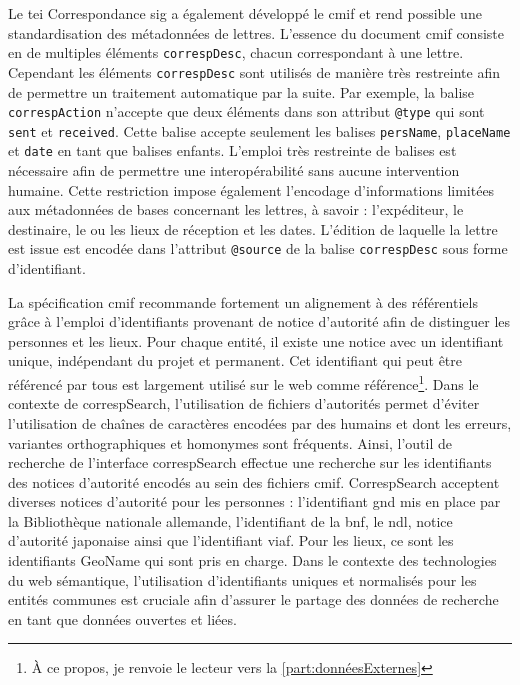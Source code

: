 \documentclass[a4paper, 12pt, twoside]{book}
\begin{document}
Le \gls{tei} Correspondance \gls{sig} a également développé le \gls{cmif} et rend possible une standardisation des métadonnées de lettres. L'essence du document \gls{cmif} consiste en de multiples éléments \texttt{correspDesc}, chacun correspondant à une lettre. Cependant les éléments \texttt{correspDesc} sont utilisés de manière très restreinte afin de permettre un traitement automatique par la suite. Par exemple, la balise \texttt{correspAction} n'accepte que deux éléments dans son attribut \texttt{@type} qui sont \texttt{sent} et \texttt{received}. Cette balise accepte seulement les balises \texttt{persName}, \texttt{placeName} et \texttt{date} en tant que balises enfants. L'emploi très restreinte de balises est nécessaire afin de permettre une interopérabilité sans aucune intervention humaine. Cette restriction impose également l'encodage d'informations limitées aux métadonnées de bases concernant les lettres, à savoir : l'expéditeur, le destinaire, le ou les lieux de réception et les dates. L'édition de laquelle la lettre est issue est encodée dans l'attribut \texttt{@source} de la balise \texttt{correspDesc} sous forme d'identifiant.

La spécification \gls{cmif} recommande fortement un alignement à des référentiels grâce à l'emploi d'identifiants provenant de notice d'autorité afin de distinguer les personnes et les lieux. Pour chaque entité, il existe une notice avec un identifiant unique, indépendant du projet et permanent. Cet identifiant qui peut être référencé par tous est largement utilisé sur le web comme référence\footnote{À ce propos, je renvoie le lecteur vers la \autoref{part:donnéesExternes}}. Dans le contexte de correspSearch, l'utilisation de fichiers d'autorités permet d'éviter l'utilisation de chaînes de caractères encodées par des humains et dont les erreurs, variantes orthographiques et homonymes sont fréquents. Ainsi, l'outil de recherche de l'interface correspSearch effectue une recherche sur les identifiants des notices d'autorité encodés au sein des fichiers \gls{cmif}. CorrespSearch acceptent diverses notices d'autorité pour les personnes : l'identifiant \gls{gnd} mis en place par la Bibliothèque nationale allemande, l'identifiant de la \gls{bnf}, le \gls{ndl}, notice d'autorité japonaise ainsi que l'identifiant \gls{viaf}. Pour les lieux, ce sont les identifiants GeoName qui sont pris en charge. Dans le contexte des technologies du web sémantique, l'utilisation d'identifiants uniques et normalisés pour les entités communes est cruciale afin d'assurer le partage des données de recherche en tant que données ouvertes et liées. 
\end{document}
